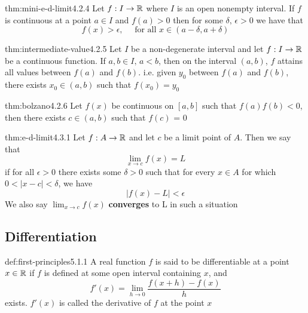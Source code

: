 \documentclass[landscape, 8pt]{extarticle}
\begin{document}
\begin{multicols}{3}
\begin{thm}{thm:mini-e-d-limit}{4.2.4}
Let $f: I\to \mathbb{R}$ where $I$ is an open nonempty interval. If $f$ is continuous at a point $a\in I$ and $f(a)> 0$ then for some $\delta,\,\epsilon> 0$ we have that
\[f(x)>\epsilon,\quad \text{ for all } x\in (a-\delta, a+\delta)\]
\end{thm}
\vspace{-5pt}

\begin{thm}{thm:intermediate-value}{4.2.5}
Let $I$ be a non-degenerate interval and let $f:I\to\mathbb{R}$ be a continuous function. If $a,b\in I,\,a<b$, then on the interval $(a,b)$, $f$ attains all values between $f(a)$ and $f(b)$. i.e. given $y_{0}$ between $f(a)$ and $f(b)$, there exists $x_{0}\in(a,b)$ such that $f(x_{0}) = y_{0}$
\end{thm}
\vspace{-5pt}

\begin{thm}{thm:bolzano}{4.2.6}
Let $f(x)$ be continuous on $[a,b]$ such that $f(a)f(b) < 0$, then there exists $c\in (a,b)$ such that $f(c)$ = 0
\end{thm}
\vspace{-5pt}

\begin{thm}{thm:e-d-limit}{4.3.1}
    Let $f:A\to\mathbb{R}$ and let $c$ be a limit point of $A$. Then we say that
    \[\displaystyle\lim_{x \to c} f(x) = L\]
    if for all $\epsilon>0$ there exists some $\delta>0$ such that for every $x\in A$ for which $0<\lvert x-c \rvert<\delta$, we have
    \[\lvert f(x)-L \rvert<\epsilon \]
    We also say $\displaystyle\lim_{x \to c}f(x)$ \textbf{converges} to L in such a situation
\end{thm}
\vspace{-5pt}


\subsection*{Differentiation}
\begin{dfn}{def:first-principles}{5.1.1}
A real function $f$ is said to be differentiable at a point $x\in \mathbb{R}$ if $f$ is defined at some open interval containing $x$, and
\[f'(x) = \lim_{h\to 0} \frac{f(x+h) - f(x)}{h}\]
exists. $f'(x)$ is called the derivative of $f$ at the point $x$
\end{dfn}
\vspace{-5pt}


\end{multicols}
\end{document}
